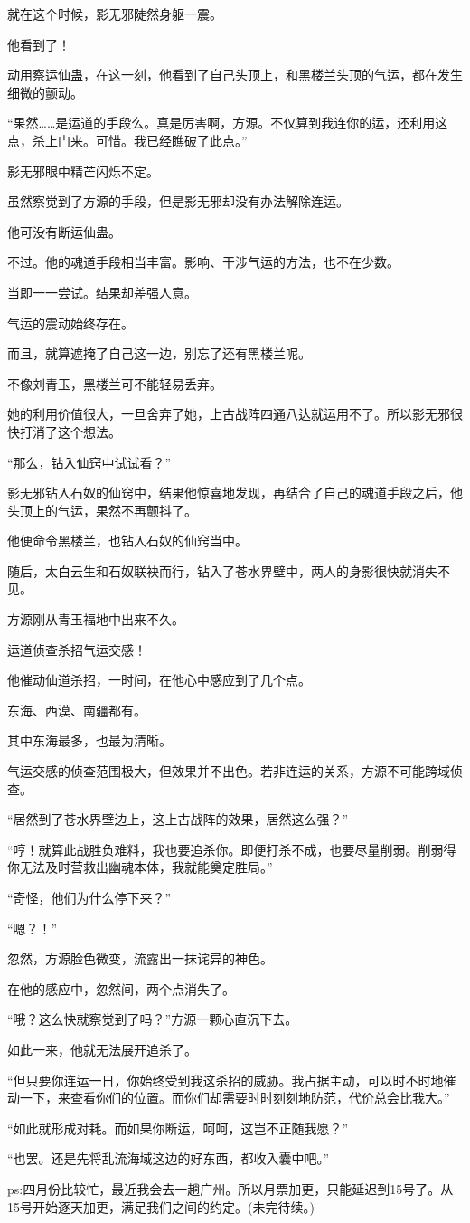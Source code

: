 \begin{this_body}
就在这个时候，影无邪陡然身躯一震。

他看到了！

动用察运仙蛊，在这一刻，他看到了自己头顶上，和黑楼兰头顶的气运，都在发生细微的颤动。

“果然……是运道的手段么。真是厉害啊，方源。不仅算到我连你的运，还利用这点，杀上门来。可惜。我已经瞧破了此点。”

影无邪眼中精芒闪烁不定。

虽然察觉到了方源的手段，但是影无邪却没有办法解除连运。

他可没有断运仙蛊。

不过。他的魂道手段相当丰富。影响、干涉气运的方法，也不在少数。

当即一一尝试。结果却差强人意。

气运的震动始终存在。

而且，就算遮掩了自己这一边，别忘了还有黑楼兰呢。

不像刘青玉，黑楼兰可不能轻易丢弃。

她的利用价值很大，一旦舍弃了她，上古战阵四通八达就运用不了。所以影无邪很快打消了这个想法。

“那么，钻入仙窍中试试看？”

影无邪钻入石奴的仙窍中，结果他惊喜地发现，再结合了自己的魂道手段之后，他头顶上的气运，果然不再颤抖了。

他便命令黑楼兰，也钻入石奴的仙窍当中。

随后，太白云生和石奴联袂而行，钻入了苍水界壁中，两人的身影很快就消失不见。

方源刚从青玉福地中出来不久。

运道侦查杀招气运交感！

他催动仙道杀招，一时间，在他心中感应到了几个点。

东海、西漠、南疆都有。

其中东海最多，也最为清晰。

气运交感的侦查范围极大，但效果并不出色。若非连运的关系，方源不可能跨域侦查。

“居然到了苍水界壁边上，这上古战阵的效果，居然这么强？”

“哼！就算此战胜负难料，我也要追杀你。即便打杀不成，也要尽量削弱。削弱得你无法及时营救出幽魂本体，我就能奠定胜局。”

“奇怪，他们为什么停下来？”

“嗯？！”

忽然，方源脸色微变，流露出一抹诧异的神色。

在他的感应中，忽然间，两个点消失了。

“哦？这么快就察觉到了吗？”方源一颗心直沉下去。

如此一来，他就无法展开追杀了。

“但只要你连运一日，你始终受到我这杀招的威胁。我占据主动，可以时不时地催动一下，来查看你们的位置。而你们却需要时时刻刻地防范，代价总会比我大。”

“如此就形成对耗。而如果你断运，呵呵，这岂不正随我愿？”

“也罢。还是先将乱流海域这边的好东西，都收入囊中吧。”

ps:四月份比较忙，最近我会去一趟广州。所以月票加更，只能延迟到15号了。从15号开始逐天加更，满足我们之间的约定。(未完待续。)

\end{this_body}

